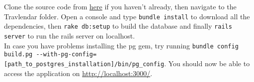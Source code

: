 Clone the source code from \href{https://github.com/TommasoBianchi/BettiBianchi_SWENG2}{here} if you haven't already, then navigate to the Travlendar folder. Open a console and type \verb;bundle install; to download all the dependencies, then \verb;rake db:setup; to build the database and finally \verb;rails server; to run the rails server on localhost. \\
In case you have problems installing the pg gem, try running \verb;bundle config build.pg --with-pg-config=[path_to_postgres_installation]/bin/pg_config;.
You should now be able to access the application on \href{http://localhost:3000/}{http://localhost:3000/}.